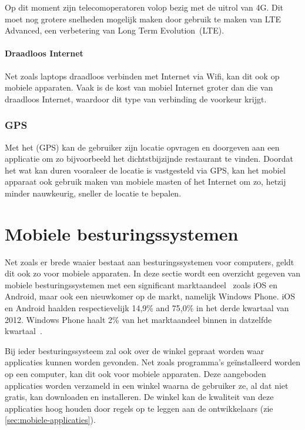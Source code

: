 Op dit moment zijn telecomoperatoren volop bezig met de uitrol van 4G.
Dit moet nog grotere snelheden mogelijk maken door gebruik te maken van LTE Advanced, een verbetering van Long Term Evolution~(LTE).

\paragraph{Draadloos Internet}
Net zoals laptops draadloos verbinden met Internet via Wifi, kan dit ook op mobiele apparaten.
Vaak is de kost van mobiel Internet groter dan die van draadloos Internet, waardoor dit type van verbinding de voorkeur krijgt.

\subsubsection{GPS}
Met het  (GPS) kan de gebruiker zijn locatie opvragen en doorgeven aan een applicatie om zo bijvoorbeeld het dichtstbijzijnde restaurant te vinden. 
Doordat het wat kan duren vooraleer de locatie is vastgesteld via GPS, kan het mobiel apparaat ook gebruik maken van mobiele masten of het Internet om zo, hetzij minder nauwkeurig, sneller de locatie te bepalen.


\section{Mobiele besturingssystemen}
\label{sec:mobiele-besturingssystemen}
Net zoals er brede waaier bestaat aan besturingssystemen voor computers, geldt dit ook zo voor mobiele apparaten. 
In deze sectie wordt een overzicht gegeven van mobiele besturingssystemen met een significant marktaandeel~\cite{David2011, Hales2012} zoals iOS en Android, maar ook een nieuwkomer op de markt, namelijk Windows Phone.
iOS en Android haalden respectievelijk 14,9\% and 75,0\% in het derde kwartaal van 2012.
Windows Phone haalt 2\% van het marktaandeel binnen in datzelfde kwartaal~\cite{Protalinski2012}.

Bij ieder besturingssysteem zal ook over de winkel gepraat worden waar applicaties kunnen worden gevonden.
Net zoals programma's geïnstalleerd worden op een computer, kan dit ook voor mobiele apparaten.
Deze aangeboden applicaties worden verzameld in een winkel waarna de gebruiker ze, al dat niet gratis, kan downloaden en installeren.
De winkel kan de kwaliteit van deze applicaties hoog houden door regels op te leggen aan de ontwikkelaars (zie \ref{sec:mobiele-applicaties}).

